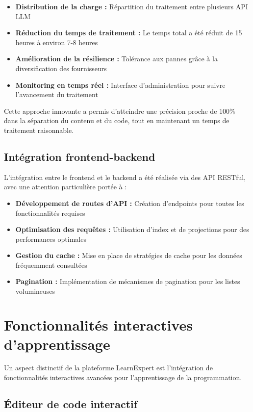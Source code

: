 \begin{itemize}
  \item \textbf{Distribution de la charge :} Répartition du traitement entre plusieurs API LLM
  \item \textbf{Réduction du temps de traitement :} Le temps total a été réduit de 15 heures à environ 7-8 heures
  \item \textbf{Amélioration de la résilience :} Tolérance aux pannes grâce à la diversification des fournisseurs
  \item \textbf{Monitoring en temps réel :} Interface d'administration pour suivre l'avancement du traitement
\end{itemize}

Cette approche innovante a permis d'atteindre une précision proche de 100\% dans la séparation du contenu et du code, tout en maintenant un temps de traitement raisonnable.

\subsection{Intégration frontend-backend}

L'intégration entre le frontend et le backend a été réalisée via des API RESTful, avec une attention particulière portée à :

\begin{itemize}
  \item \textbf{Développement de routes d'API :} Création d'endpoints pour toutes les fonctionnalités requises
  \item \textbf{Optimisation des requêtes :} Utilisation d'index et de projections pour des performances optimales
  \item \textbf{Gestion du cache :} Mise en place de stratégies de cache pour les données fréquemment consultées
  \item \textbf{Pagination :} Implémentation de mécanismes de pagination pour les listes volumineuses
\end{itemize}

\section{Fonctionnalités interactives d'apprentissage}

Un aspect distinctif de la plateforme LearnExpert est l'intégration de fonctionnalités interactives avancées pour l'apprentissage de la programmation.

\subsection{Éditeur de code interactif}

